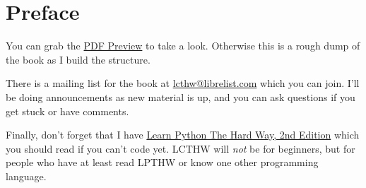 \chapter{Preface}

You can grab the \href{http://learncodethehardway.org/LearnCTheHardWay-preview.pdf}{PDF Preview}
to take a look.  Otherwise this is a rough dump of the book as I build the structure.

There is a mailing list for the book at
\href{mailto:lcthw@librelist.com}{lcthw@librelist.com} which you can join.
I'll be doing announcements as new material is up, and you can ask questions if
you get stuck or have comments.

Finally, don't forget that I have \href{http://learnpythonthehardway.org}{Learn Python The Hard Way, 2nd Edition} which you should read if you can't code yet.   LCTHW will
\emph{not} be for beginners, but for people who have at least read LPTHW or know
one other programming language.
